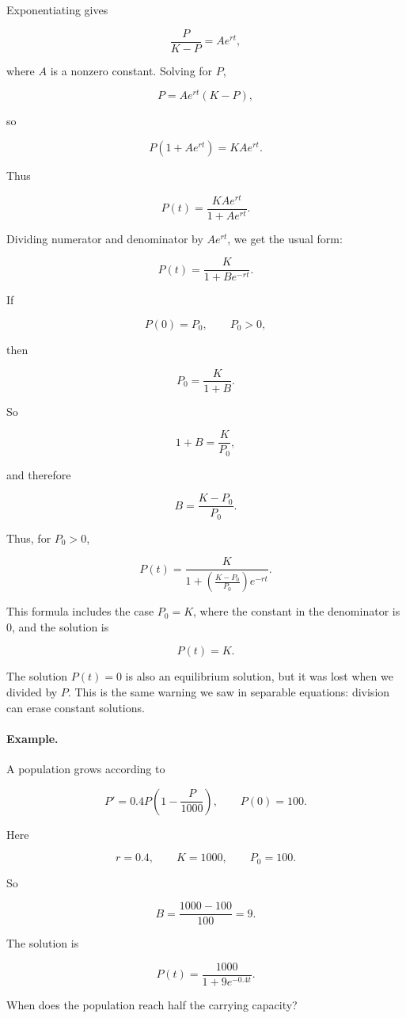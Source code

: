 Exponentiating gives

\[
\frac{P}{K-P}=Ae^{rt},
\]

where \(A\) is a nonzero constant.  Solving for \(P\),

\[
P=Ae^{rt}(K-P),
\]

so

\[
P(1+Ae^{rt})=KAe^{rt}.
\]

Thus

\[
P(t)=\frac{KAe^{rt}}{1+Ae^{rt}}.
\]

Dividing numerator and denominator by \(Ae^{rt}\), we get the usual form:

\[
\boxed{
P(t)=\frac{K}{1+Be^{-rt}}.
}
\]

If

\[
P(0)=P_0,
\qquad P_0>0,
\]

then

\[
P_0=\frac{K}{1+B}.
\]

So

\[
1+B=\frac{K}{P_0},
\]

and therefore

\[
\boxed{
B=\frac{K-P_0}{P_0}.
}
\]

Thus, for \(P_0>0\),

\[
\boxed{
P(t)=\frac{K}{1+\left(\frac{K-P_0}{P_0}\right)e^{-rt}}.
}
\]

This formula includes the case \(P_0=K\), where the constant in the denominator is
\(0\), and the solution is

\[
P(t)=K.
\]

The solution \(P(t)=0\) is also an equilibrium solution, but it was lost when we divided
by \(P\).  This is the same warning we saw in separable equations: division can erase
constant solutions.

\paragraph{Example.}
A population grows according to

\[
P'=0.4P\left(1-\frac{P}{1000}\right),
\qquad
P(0)=100.
\]

Here

\[
r=0.4,
\qquad
K=1000,
\qquad
P_0=100.
\]

So

\[
B=\frac{1000-100}{100}=9.
\]

The solution is

\[
\boxed{
P(t)=\frac{1000}{1+9e^{-0.4t}}.
}
\]

When does the population reach half the carrying capacity?

